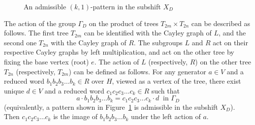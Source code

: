 \documentclass[12pt]{article}
\theoremstyle{definition}
\begin{document}
\begin{figure}[t]
\begin{center}
\end{center}
\caption{An admissible $(k,1)$-pattern in the subshift $X_D$}\label{fig:(k,1)-pattern in X_D}
\end{figure}

The action of the group $\Gamma_D$ on the product of trees $T_{2m}\times T_{2n}$ can be described as follows.
The first tree $T_{2m}$ can be identified with the Cayley graph of $L$, and the second one $T_{2n}$ with the Cayley graph of $R$. The subgroups $L$ and $R$ act on their respective Cayley graphs by left multiplication, and act on the other tree by fixing the base vertex (root) $e$. The action of $L$ (respectively, $R$) on the other tree $T_{2n}$ (respectively, $T_{2m}$) can be defined as follows. For any generator $a\in V$ and a reduced word $b_1b_2b_3\ldots b_k\in R$ over $H$, viewed as a vertex of the tree, there exist unique $d\in V$ and a reduced word $c_1c_2c_3\ldots c_k\in R$ such that
\begin{equation}\label{eqn:relation_Gamma_D}
a\cdot b_1b_2b_3\ldots b_k=c_1c_2c_3\ldots c_k\cdot d \ \mbox{ in $\Gamma_D$}
\end{equation}
(equivalently, a pattern shown in Figure~\ref{fig:(k,1)-pattern in X_D} is admissible in the subshift $X_D$). Then $c_1c_2c_3\ldots c_k$ is the image of $b_1b_2b_3\ldots b_k$ under the left action of $a$.
\end{document}
